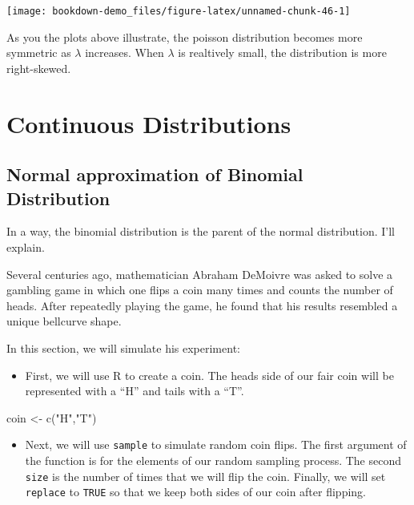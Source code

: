 \documentclass[
]{book}
\newenvironment{Shaded}{\begin{snugshade}}{\end{snugshade}}
\newcommand{\FunctionTok}[1]{\textcolor[rgb]{0.00,0.00,0.00}{#1}}
\newcommand{\NormalTok}[1]{#1}
\newcommand{\OtherTok}[1]{\textcolor[rgb]{0.56,0.35,0.01}{#1}}
\newcommand{\StringTok}[1]{\textcolor[rgb]{0.31,0.60,0.02}{#1}}
\providecommand{\tightlist}{%
  \setlength{\itemsep}{0pt}\setlength{\parskip}{0pt}}
\begin{document}
\begin{center}\texttt{[image: bookdown-demo\_files/figure-latex/unnamed-chunk-46-1]} \end{center}

As you the plots above illustrate, the poisson distribution becomes more symmetric as \(\lambda\) increases. When \(\lambda\) is realtively small, the distribution is more right-skewed.

\hypertarget{Continuous}{%
\chapter{Continuous Distributions}\label{Continuous}}

\hypertarget{normal-approximation-of-binomial-distribution}{%
\section{Normal approximation of Binomial Distribution}\label{normal-approximation-of-binomial-distribution}}

In a way, the binomial distribution is the parent of the normal distribution. I'll explain.

Several centuries ago, mathematician Abraham DeMoivre was asked to solve a gambling game in which one flips a coin many times and counts the number of heads. After repeatedly playing the game, he found that his results resembled a unique bellcurve shape.

In this section, we will simulate his experiment:

\begin{itemize}
\tightlist
\item
  First, we will use R to create a coin. The heads side of our fair coin will be represented with a ``H'' and tails with a ``T''.
\end{itemize}

\begin{Shaded}
\begin{Highlighting}[]
\NormalTok{coin }\OtherTok{\textless{}{-}} \FunctionTok{c}\NormalTok{(}\StringTok{"H"}\NormalTok{,}\StringTok{"T"}\NormalTok{)}
\end{Highlighting}
\end{Shaded}

\begin{itemize}
\tightlist
\item
  Next, we will use \texttt{sample} to simulate random coin flips. The first argument of the function is for the elements of our random sampling process. The second \texttt{size} is the number of times that we will flip the coin. Finally, we will set \texttt{replace} to \texttt{TRUE} so that we keep both sides of our coin after flipping.
\end{itemize}
\end{document}
